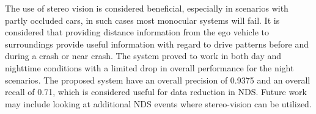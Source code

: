 The use of stereo vision is considered beneficial, especially in scenarios with partly occluded cars, in such cases most monocular systems will fail. It is considered that providing distance information from the ego vehicle to surroundings provide useful information with regard to drive patterns before and during a crash or near crash. The system proved to work in both day and nighttime conditions with a limited drop in overall performance for the night scenarios. The proposed system have an overall precision of 0.9375 and an overall recall of 0.71, which is considered useful for data reduction in NDS. Future work may include looking at additional NDS events where stereo-vision can be utilized.